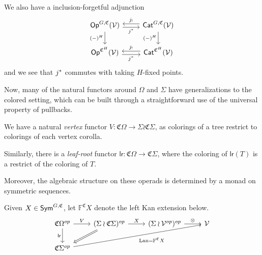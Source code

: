 \documentclass[a4paper,10pt
]{article}%
\renewcommand{\1}{\ensuremath{\mathbb{id}}}
\begin{document}
\begin{remark}
      We also have a inclusion-forgetful adjunction
      \begin{equation}
            \label{JSTAR_CAT_EQ}
            \begin{tikzcd}
                  \Op^{G, \mathfrak C}(\V) \arrow[r, shift right, "j^{\**}"'] \arrow[d, "{(-)^H}"']
                  &
                  \Cat^{G, \mathfrak C}(\V) \arrow[l, shift right, "j_!"'] \arrow[d, "{(-)^H}"']
                  \\
                  \Op^{\mathfrak C^H}(\V)  \arrow[r, shift right, "j^{\**}"']
                  &
                  \Cat^{\mathfrak C^H}(\V) \arrow[l, shift right, "j_!"']
            \end{tikzcd}
      \end{equation}
      and we see that $j^{\**}$ commutes with taking $H$-fixed points.
\end{remark}

Now, many of the natural functors around $\Omega$ and $\Sigma$ have generalizations to the colored setting,
which can be built through a straightforward use of the universal property of pullbacks.

\begin{definition}
      We have a natural \textit{vertex} functor
      $V: \mathfrak C \Omega \to \Sigma \wr \mathfrak C \Sigma$,
      as colorings of a tree restrict to colorings of each vertex corolla.

      Similarly, there is a \textit{leaf-root} functor
      $\mathsf{lr}: \mathfrak C \Omega \to \mathfrak C \Sigma$,
      where the coloring of $\mathsf{lr}(T)$ is a restrict of the coloring of $T$.
\end{definition}



Moreover, the algebraic structure on these operads is determined by a monad on symmetric sequences.

\begin{definition}
      Given $X \in \mathsf{Sym}^{G, \mathfrak C}$, let $\mathbb F^{\mathfrak C} X$ denote the left Kan extension below.
      \begin{equation} 
           \begin{tikzcd}
                  \mathfrak C \Omega^{op}
                  \arrow[d, "\mathsf{lr}"']
                  \arrow[r, "V"]
                  &
                  (\Sigma \wr \mathfrak C \Sigma)^{op} \arrow[r, "X"]
                  \arrow[dl, Rightarrow]
                  &
                  (\Sigma \wr \V^{op})^{op} \arrow[r, "\otimes"]
                  &
                  \V
                  \\
                  \mathfrak C \Sigma^{op} \arrow[urrr, "\Lan = \mathbb F^{\mathfrak C} X"']
            \end{tikzcd}
      \end{equation}
\end{definition}
\end{document}
